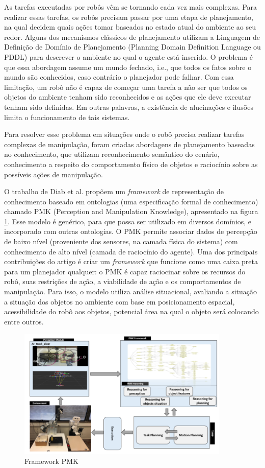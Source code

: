 As tarefas executadas por robôs vêm se tornando cada vez mais complexas. Para realizar essas tarefas, os robôs precisam passar por uma etapa de planejamento, na qual decidem quais ações tomar baseados no estado atual do ambiente ao seu redor. Alguns dos mecanismos clássicos de planejamento utilizam a Linguagem de Definição de Domínio de Planejamento (Planning Domain Definition Language ou PDDL) para descrever o ambiente no qual o agente está inserido. O problema é que essa abordagem assume um mundo fechado, i.e., que todos os fatos sobre o mundo são conhecidos, caso contrário o planejador pode falhar. Com essa limitação, um robô não é capaz de começar uma tarefa a não ser que todos os objetos do ambiente tenham sido reconhecidos e as ações que ele deve executar tenham sido definidas. Em outras palavras, a existência de alucinações e ilusões limita o funcionamento de tais sistemas.

Para resolver esse problema em situações onde o robô precisa realizar tarefas complexas de manipulação, foram criadas abordagens de planejamento baseadas no conhecimento, que utilizam reconhecimento semântico do cenário, conhecimento a respeito do comportamento físico de objetos e raciocínio sobre as possíveis ações de manipulação.

O trabalho de Diab et al. propõem um \textit{framework} de representação de conhecimento baseado em ontologias (uma especificação formal de conhecimento) chamado PMK (Perception and Manipulation Knowledge), apresentado na figura \ref{fig:pmk}. Esse modelo é genérico, para que possa ser utilizado em diversos domínios, e incorporado com outras ontologias. O PMK permite associar dados de percepção de baixo nível (proveniente dos sensores, na camada física do sistema) com conhecimento de alto nível (camada de raciocínio do agente).
Uma dos principais contribuições do artigo é criar um \textit{framework} que funcione como uma caixa preta para um planejador qualquer: o PMK é capaz raciocinar sobre os recursos do robô, suas restrições de ação, a viabilidade de ação e os comportamentos de manipulação. Para isso, o modelo utiliza análise situacional, avaliando a situação a situação dos objetos no ambiente com base em posicionamento espacial, acessibilidade do robô aos objetos, potencial área na qual o objeto será colocando entre outros. 

\begin{figure}
    \centering
    \includegraphics[width=0.9\textwidth]{Images/pmk-model.png}
    \caption{Framework PMK}
    \label{fig:pmk}
\end{figure}

